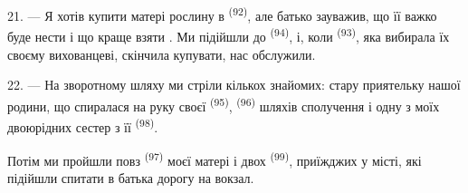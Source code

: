 21. --- Я хотів купити матері рослину в 
\textsuperscript{(92)}, але батько зауважив, що її важко буде нести і що краще
взяти . Ми підійшли до 
\textsuperscript{(94)}, і, коли  \textsuperscript{(93)}, яка
вибирала їх своєму вихованцеві, скінчила купувати, нас обслужили.

22. --- На зворотному шляху ми стріли кількох знайомих: стару приятельку нашої
родини, що спиралася на руку своєї 
\textsuperscript{(95)},  \textsuperscript{(96)} шляхів
сполучення і одну з моїх двоюрідних сестер з її 
\textsuperscript{(98)}.

Потім ми пройшли повз  \textsuperscript{(97)} моєї матері і
двох  \textsuperscript{(99)}, приїжджих у місті, які підійшли
спитати в батька дорогу на вокзал.
\VUsaut{6.0mm}
\VUfilet{22mm}
